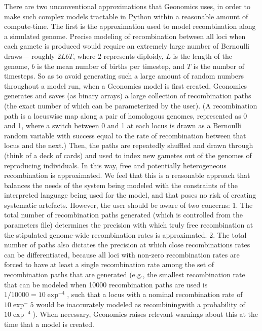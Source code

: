 ﻿\documentclass{article}
\begin{document}
There are two unconventional approximations that Geonomics uses,
in order to make such complex models tractable in Python within a reasonable amount of compute-time.
The first is the approximation used to model recombination along a simulated genome.
Precise modeling of recombination between all loci when each gamete is produced
would require an extremely large number of Bernoulli draws---
roughly $2LbT$, where $2$ represents diploidy, $L$ is the length of the genome,
$b$ is the mean number of births per timestep, and $T$ is the number of timesteps.
So as to avoid generating such a large amount of random numbers throughout a model run,
when a Geonomics model is first created, Geonomics generates and saves
(as binary arrays) a large collection of recombination paths (the exact number of which can
be parameterized by the user).
(A recombination path is a locuswise map along a pair of homologous genomes,
represented as 0 and 1, where a switch between 0 and 1 at each locus is drawn as a Bernoulli
random variable with success equal to the rate of recombination between that locus and the next.)
Then, the paths are repeatedly shuffled and drawn through (think of a deck of cards)
and used to index new gametes out of the genomes of reproducing individuals.
In this way, free and potentially heterogeneous recombination is approximated.
We feel that this is a reasonable approach that balances the needs of the system being modeled
with the constraints of the interpreted language being used for the model,
and that poses no risk of creating systematic artefacts.
However, the user should be aware of two concerns:
1. The total number of recombination paths generated
(which is controlled from the parameters file) determines the precision with which truly 
free recombination at the stipulated genome-wide recombination rates is approximated.
2. The total number of paths also dictates the precision at which close recombinations
rates can be differentiated, because all loci with non-zero recombination rates are forced to
have at least a single recombination rate among the set of recombination paths that are generated
(e.g., the smallest recombination rate that can be modeled when 10000 recombination paths
are used is $1/10000=10\exp^{-4}$, such that a locus with a nominal recombination rate of 
$10\exp^-5$ would be inaccurately modeled as recombiningwith a probability of $10\exp^{-4}$). 
When necessary, Geonomics raises relevant warnings about this at the time that a model is created.
\end{document}
